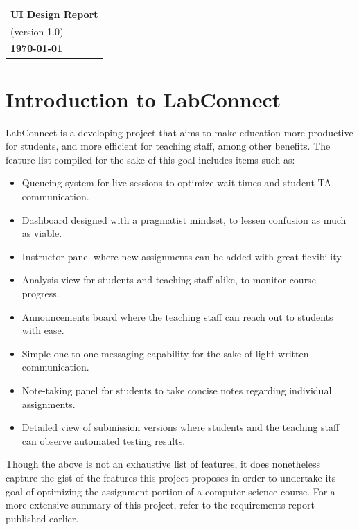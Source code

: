 \documentclass[a4paper, 12pt]{article}
\begin{document}
    \begin{table}[h!]
        \renewcommand{\arraystretch}{1.5}
        \centering
        \begin{tabular}{ |>{\centering\arraybackslash}m{15.15cm}| }
            \hline
            \Large \textbf{UI Design Report} \\
            \small (version 1.0) \\
            \small \textbf{\today} \\
            \hline
        \end{tabular}
    \end{table}


    \section{Introduction to LabConnect}

    LabConnect is a developing project that aims to make education more productive for students,
    and more efficient for teaching staff, among other benefits. The feature list compiled for the
    sake of this goal includes items such as:
    \begin{itemize}
        \item Queueing system for live sessions to optimize wait times and student-TA communication.
        \item Dashboard designed with a pragmatist mindset, to lessen confusion as much as viable.
        \item Instructor panel where new assignments can be added with great flexibility.
        \item Analysis view for students and teaching staff alike, to monitor course progress.
        \item Announcements board where the teaching staff can reach out to students with ease.
        \item Simple one-to-one messaging capability for the sake of light written communication.
        \item Note-taking panel for students to take concise notes regarding individual assignments.
        \item Detailed view of submission versions where students and the teaching staff can observe
            automated testing results.
    \end{itemize}

    Though the above is not an exhaustive list of features, it does nonetheless capture the gist of the features
    this project proposes in order to undertake its goal of optimizing the assignment portion of
    a computer science course. For a more extensive summary of this project, refer to the requirements report published earlier.
\end{document}
